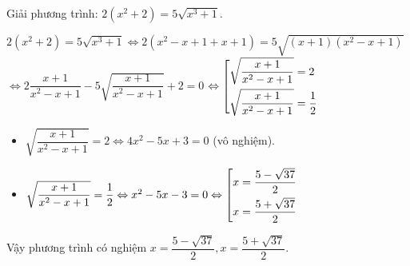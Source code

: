 \begin{ex}%
Giải phương trình:  $2(x^2+2 )=5\sqrt{x^3+1}$.
\loigiai
{
$2(x^2+2 )=5\sqrt{x^3+1} \Leftrightarrow 2(x^2-x+1+x+1 )=5\sqrt{(x+1 )(x^2-x+1 )}$\\
$\Leftrightarrow 2\dfrac{x+1}{x^2-x+1}-5\sqrt{\dfrac{x+1}{x^2-x+1}}+2=0$
$\Leftrightarrow \left[\begin{aligned}& \sqrt{\dfrac{x+1}{x^2-x+1}}=2 \\ 
 & \sqrt{\dfrac{x+1}{x^2-x+1}}=\dfrac{1}{2}\end{aligned}\right.$
 \begin{itemize}
 \item $\sqrt{\dfrac{x+1}{x^2-x+1}}=2 \Leftrightarrow 4x^2-5x+3=0$ (vô nghiệm).
 \item $\sqrt{\dfrac{x+1}{x^2-x+1}}=\dfrac{1}{2}\Leftrightarrow x^2-5x-3=0 \Leftrightarrow \left[\begin{aligned}& x=\dfrac{5-\sqrt{37}}{2}\\ &x=\dfrac{5+\sqrt{37}}{2}\end{aligned}\right.$	
 \end{itemize}
Vậy phương trình có nghiệm $x=\dfrac{5-\sqrt{37}}{2}, x=\dfrac{5+\sqrt{37}}{2}$.
}
\end{ex}
